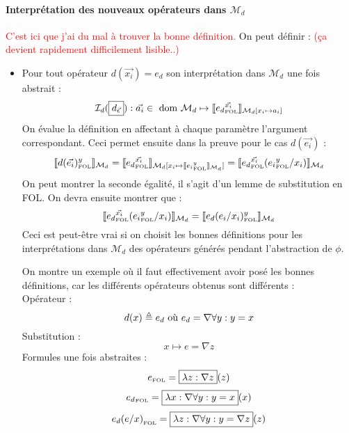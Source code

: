 \documentclass[12pt]{article}
\newcommand{\FOL}{\ensuremath{\textup{\tiny{}FOL}}}
\newcommand{\M}{\ensuremath{\mathcal{M}}}
\newcommand{\raph}[1]{\textcolor{red}{#1}}
\begin{document}
\paragraph{Interprétation des nouveaux opérateurs dans $\mathcal{M}_d$}
\raph{%
  C'est ici que j'ai du mal à trouver la bonne définition.}
On peut définir : \raph{ (ça devient rapidement difficilement lisible..) }
\begin{itemize}
\item
  Pour tout opérateur $d(\vec{x_i}) = e_d$ son interprétation dans $\mathcal{M}_d$ une fois abstrait :
  \[
    \mathcal{I}_d(\framebox{$d_{\vec{\epsilon}}$}) : \vec{a_i} \in \textup{ dom } \mathcal{M}_d \mapsto
    \llbracket {e_d}_\FOL^{\vec{x_i}} \rrbracket_{\mathcal{M}_d[x_i \mapsto a_i]}
  \]
  On évalue la définition en affectant à chaque paramètre l'argument correspondant.
  Ceci permet ensuite dans la preuve pour le cas $d(\vec{e_i})$ :
  \[
    \llbracket d(\vec{e_i})_\FOL^y \rrbracket_{\mathcal{M}_d} =
    \llbracket {e_d}_\FOL^{\vec{x_i}} \rrbracket_{\mathcal{M}_d[x_i \mapsto \llbracket {e_i}_\FOL^y \rrbracket_{\mathcal{M}_d} ]} =
    \llbracket {e_d}_\FOL^{\vec{x_i}} ({e_i}_\FOL^y/{x_i}) \rrbracket_{\mathcal{M}_d}
  \]
  On peut montrer la seconde égalité, il s'agit d'un lemme de substitution en FOL.
  On devra ensuite montrer que :
  \[
    \llbracket {e_d}_\FOL^{\vec{x_i}} ({e_i}_\FOL^y/{x_i}) \rrbracket_{\mathcal{M}_d} =
    \llbracket {e_d(e_i/x_i)_\FOL^y} \rrbracket_{\mathcal{M}_d}
  \]
  Ceci est peut-être vrai si on choisit les bonnes définitions pour les interprétations dans $\M_d$ des opérateurs générés pendant l'abstraction de $\phi$.

  On montre un exemple où il faut effectivement avoir posé les bonnes définitions, car les différents opérateurs obtenus sont différents : \\
  Opérateur :
  \[ d(x) \triangleq e_d \textup{ où } e_d = \nabla \forall y : y = x \]
  Substitution :
  \[ x \mapsto e = \nabla z \]
  Formules une fois abstraites :
  \[ e_\FOL = \framebox{$\lambda z : \nabla z$}(z) \]
  \[ {e_d}_\FOL = \framebox{$\lambda x : \nabla \forall y : y = x$}(x) \]
  \[ {e_d(e/x)}_\FOL = \framebox{$\lambda z : \nabla \forall y : y = \nabla z$}(z) \]
\end{itemize}
\end{document}
